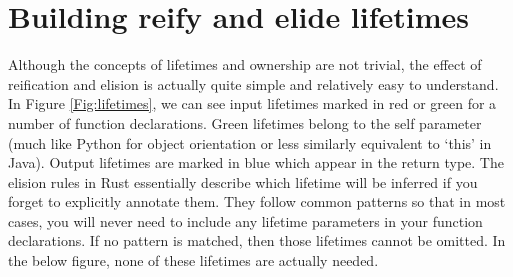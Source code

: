 

\section{Building reify and elide lifetimes}\label{S:buildreielide}
Although the concepts of lifetimes and ownership are not trivial, the effect of reification and elision is actually quite simple and relatively easy to understand. In Figure \ref{Fig:lifetimes}, we can see input lifetimes marked in red or green for a number of function declarations. Green lifetimes belong to the self parameter (much like Python for object orientation or less similarly equivalent to `this' in Java). Output lifetimes are marked in blue which appear in the return type. The elision rules in Rust essentially describe which lifetime will be inferred if you forget to explicitly annotate them. They follow common patterns so that in most cases, you will never need to include any lifetime parameters in your function declarations. If no pattern is matched, then those lifetimes cannot be omitted. In the below figure, none of these lifetimes are actually needed.

